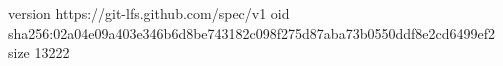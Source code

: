 version https://git-lfs.github.com/spec/v1
oid sha256:02a04e09a403e346b6d8be743182c098f275d87aba73b0550ddf8e2cd6499ef2
size 13222
